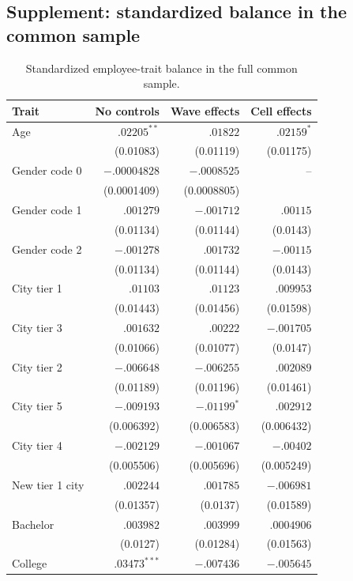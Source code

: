 \documentclass[11pt,letterpaper,english,final]{article}
\begin{document}
\subsection{Supplement: standardized balance in the common sample}
\begin{table}[H]
\centering\small
\setlength{\tabcolsep}{4pt}
\caption{Standardized employee-trait balance in the full common sample.}
\begin{tabular}{lrrr}
\toprule
Trait & No controls & Wave effects & Cell effects \\
\midrule
Age & $.02205^{**}$ & $.01822$ & $.02159^{*}$ \\
 & (0.01083) & (0.01119) & (0.01175) \\[1pt]
Gender code 0 & $-.00004828$ & $-.0008525$ & -- \\
 & (0.0001409) & (0.0008805) &  \\[1pt]
Gender code 1 & $.001279$ & $-.001712$ & $.00115$ \\
 & (0.01134) & (0.01144) & (0.0143) \\[1pt]
Gender code 2 & $-.001278$ & $.001732$ & $-.00115$ \\
 & (0.01134) & (0.01144) & (0.0143) \\[1pt]
City tier 1 & $.01103$ & $.01123$ & $.009953$ \\
 & (0.01443) & (0.01456) & (0.01598) \\[1pt]
City tier 3 & $.001632$ & $.00222$ & $-.001705$ \\
 & (0.01066) & (0.01077) & (0.0147) \\[1pt]
City tier 2 & $-.006648$ & $-.006255$ & $.002089$ \\
 & (0.01189) & (0.01196) & (0.01461) \\[1pt]
City tier 5 & $-.009193$ & $-.01199^{*}$ & $.002912$ \\
 & (0.006392) & (0.006583) & (0.006432) \\[1pt]
City tier 4 & $-.002129$ & $-.001067$ & $-.00402$ \\
 & (0.005506) & (0.005696) & (0.005249) \\[1pt]
New tier 1 city & $.002244$ & $.001785$ & $-.006981$ \\
 & (0.01357) & (0.0137) & (0.01589) \\[1pt]
Bachelor & $.003982$ & $.003999$ & $.0004906$ \\
 & (0.0127) & (0.01284) & (0.01563) \\[1pt]
College & $.03473^{***}$ & $-.007436$ & $-.005645$ \\

\end{tabular}
\end{table}
\end{document}

